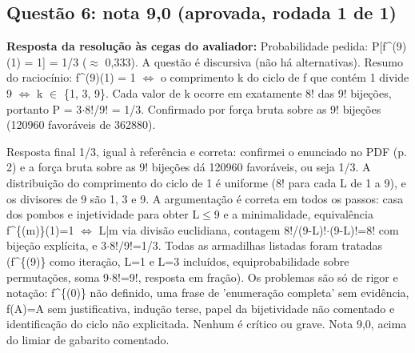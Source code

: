 \documentclass{article}%
\begin{document}
\subsection*{Questão 6: nota 9,0 (aprovada, rodada 1 de 1)}%
\textbf{Resposta da resolução às cegas do avaliador:} Probabilidade pedida: P{[}f\^{}(9)(1) = 1{]} = 1/3 ($\approx$ 0,333). A questão é discursiva (não há alternativas).\newline%
\newline%
Resumo do raciocínio: f\^{}(9)(1) = 1 $\Leftrightarrow$ o comprimento k do ciclo de f que contém 1 divide 9 $\Leftrightarrow$ k $\in$ \{1, 3, 9\}. Cada valor de k ocorre em exatamente 8! das 9! bijeções, portanto P = 3$\cdot$8!/9! = 1/3. Confirmado por força bruta sobre as 9! bijeções (120960 favoráveis de 362880).\par %
Resposta final 1/3, igual à referência e correta: confirmei o enunciado no PDF (p. 2) e a força bruta sobre as 9! bijeções dá 120960 favoráveis, ou seja 1/3. A distribuição do comprimento do ciclo de 1 é uniforme (8! para cada L de 1 a 9), e os divisores de 9 são 1, 3 e 9. A argumentação é correta em todos os passos: casa dos pombos e injetividade para obter L$\leq$9 e a minimalidade, equivalência f\^{}\{(m)\}(1)=1 $\Leftrightarrow$ L|m via divisão euclidiana, contagem 8!/(9-L)!$\cdot$(9-L)!=8! com bijeção explícita, e 3$\cdot$8!/9!=1/3. Todas as armadilhas listadas foram tratadas (f\^{}\{(9)\} como iteração, L=1 e L=3 incluídos, equiprobabilidade sobre permutações, soma 9$\cdot$8!=9!, resposta em fração). Os problemas são só de rigor e notação: f\^{}\{(0)\} não definido, uma frase de 'enumeração completa' sem evidência, f(A)=A sem justificativa, indução terse, papel da bijetividade não comentado e identificação do ciclo não explicitada. Nenhum é crítico ou grave. Nota 9,0, acima do limiar de gabarito comentado.%
\end{document}
